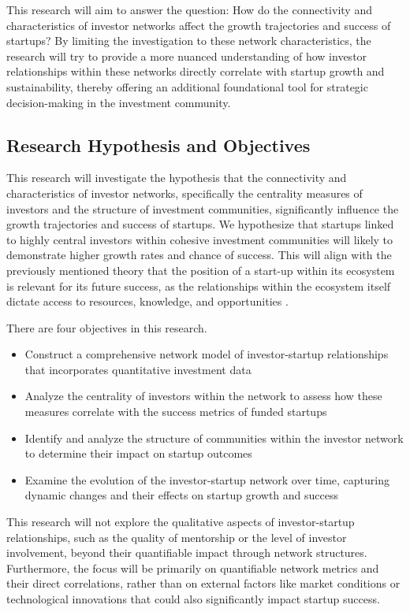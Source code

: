 \documentclass[a4paper,11pt]{article}
\begin{document}
This research will aim to answer the question: How do the connectivity and characteristics of investor networks affect the growth trajectories and success of startups? By limiting the investigation to these network characteristics, the research will try to provide a more nuanced understanding of how investor relationships within these networks directly correlate with startup growth and sustainability, thereby offering an additional foundational tool for strategic decision-making in the investment community.

\subsection{Research Hypothesis and Objectives}
This research will investigate the hypothesis that the connectivity and characteristics of investor networks, specifically the centrality measures of investors and the structure of investment communities, significantly influence the growth trajectories and success of startups. We hypothesize that startups linked to highly central investors within cohesive investment communities will likely to demonstrate higher growth rates and chance of success. This will align with the previously mentioned theory that the position of a start-up within its ecosystem is relevant for its future success, as the relationships within the ecosystem itself dictate access to resources, knowledge, and opportunities \cite{uzzi2021a}.

There are four objectives in this research. 
\begin{itemize}
    \item Construct a comprehensive network model of investor-startup relationships that incorporates quantitative investment data
    \item Analyze the centrality of investors within the network to assess how these measures correlate with the success metrics of funded startups
    \item Identify and analyze the structure of communities within the investor network to determine their impact on startup outcomes
    \item Examine the evolution of the investor-startup network over time, capturing dynamic changes and their effects on startup growth and success
\end{itemize}

This research will not explore the qualitative aspects of investor-startup relationships, such as the quality of mentorship or the level of investor involvement, beyond their quantifiable impact through network structures. Furthermore, the focus will be primarily on quantifiable network metrics and their direct correlations, rather than on external factors like market conditions or technological innovations that could also significantly impact startup success.
\end{document}
